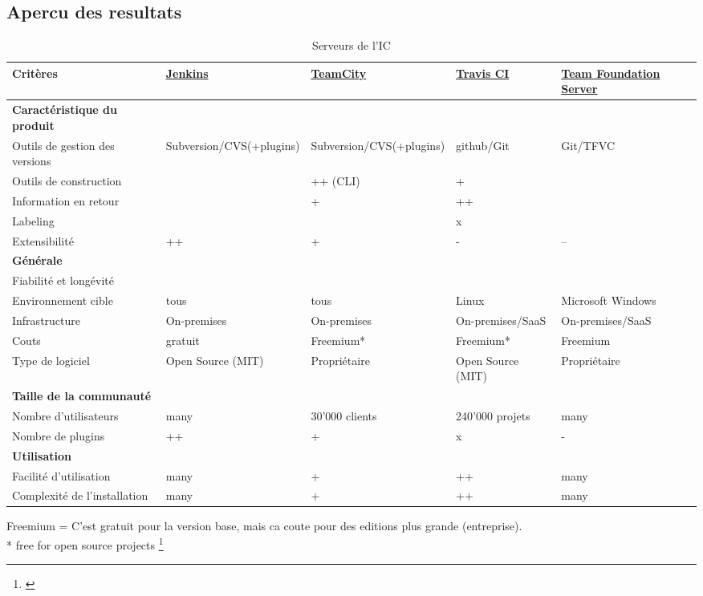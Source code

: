 \newpage
\begin{landscape}
\subsection{Apercu des resultats}
\begin{table}[H]
	\centering
		\begin{tabular}{lp{4cm}p{4cm}p{4cm}p{4cm}} \toprule
			\textbf{Critères} & \href{https://jenkins-ci.org}{\textbf{Jenkins}} & \href{https://www.jetbrains.com/teamcity/}{\textbf{TeamCity}} & \href{https://travis-ci.org}{\textbf{Travis CI}} & \href{https://www.visualstudio.com/en-us/products/tfs-overview-vs.aspx}{\textbf{Team Foundation Server}} \\ \midrule
			\rowcolor{GrayRow}\textbf{Caractéristique du produit} &  &  &  &  \\ \midrule[0.16em]
			Outils de gestion des versions & Subversion/CVS(+plugins) & Subversion/CVS(+plugins) & github/Git & Git/TFVC \\ \midrule
			Outils de construction & & ++ (CLI) & + & \\ \midrule
			Information en retour & & + & ++ & \\ \midrule
			Labeling & & \checkmark & x & \\ \midrule
			Extensibilité & ++ & + & - & -- \\ \midrule
			\rowcolor{GrayRow}\textbf{Générale} &  &  &  &  \\ \midrule[0.16em]
			Fiabilité et longévité & \checkmark & \checkmark & \checkmark & \checkmark \\ \midrule
			Environnement cible & tous & tous & Linux & Microsoft Windows \\ \midrule
			Infrastructure & On-premises & On-premises & On-premises/SaaS & On-premises/SaaS \\ \midrule
			Couts & gratuit & Freemium* & Freemium* & Freemium \\ \midrule
			Type de logiciel & Open Source (MIT) & Propriétaire & Open Source (MIT) & Propriétaire \\ \midrule
			\rowcolor{GrayRow}\textbf{Taille de la communauté} & & & & \\ \midrule[0.16em]
			Nombre d'utilisateurs & many & 30'000 clients & 240'000 projets & many \\ \midrule
			Nombre de plugins & ++ & + & x & - \\ \midrule
			\rowcolor{GrayRow}\textbf{Utilisation} &  &  &  &  \\ \midrule[0.16em]
			Facilité d'utilisation & many & + & ++ & many \\ \midrule
			Complexité de l'installation & many & + & ++ & many \\
			\bottomrule[0.16em]
		\end{tabular}
	\caption{Serveurs de l'IC}
	\label{tab:serveurs_eval}
\end{table}
Freemium = C'est gratuit pour la version base, mais ca coute pour des editions plus grande (entreprise).\\
* free for open source projects
\footnote{\citep{jenkinsplugins} \citep{teamcityenv} \citep{tfsversioncontrol}}

\end{landscape}
